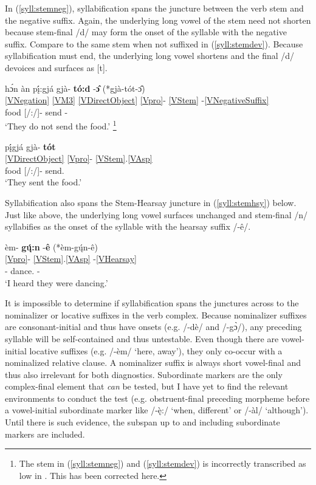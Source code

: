 \documentclass[output=paper]{langscibook}
\begin{document}
\noindent In (\ref{syll:stemneg}), syllabification spans the juncture between the verb stem and the negative suffix. Again, the underlying long vowel of the stem need not shorten because stem-final /d/ may form the onset of the syllable with the negative suffix. Compare to the same stem when not suffixed in (\ref{syll:stemdev}). Because syllabification must end, the underlying long vowel shortens and the final /d/ devoices and surfaces as [t]. 

\ea \label{syll:stemneg}
\glll h\'{ɔ}n \`an p\k{í}:gjá gj\`a- \textbf{tó:d} -\textbf{\^{ɔ}} (*gj\`a-tót-\^{ɔ})\\
\ref{VNegation} \ref{VM3} \ref{VDirectObject} {\ref{Vpro}}- \ref{VStem} -\ref{VNegativeSuffix}\\
{\Neg} {\Hab} food [\Third\Sg/\Aarg:\Sg/\Obj]- send -{\Neg}\\
\trans `They do not send the food.' \citep[][83]{Miller:2018}\footnote{The stem in (\ref{syll:stemneg}) and (\ref{syll:stemdev}) is incorrectly transcribed as low in \citet{Miller:2018}. This has been corrected here.} %
\z 

\ea \label{syll:stemdev}
\glll p\k{í}gjá gj\`a- \textbf{tót}\\
\ref{VDirectObject} {\ref{Vpro}}- \ref{VStem}.\ref{VAsp}\\
food [\Third\Sg/\Aarg:\Sg/\Obj]- send.{\Pfv}\\
\trans `They sent the food.' \citep[][83]{Miller:2018} %
\z 

\noindent Syllabification also spans the Stem-Hearsay juncture in (\ref{syll:stemhsy}) below. Just like above, the underlying long vowel surfaces unchanged and stem-final /n/ syllabifies as the onset of the syllable with the hearsay suffix /-ê/.

\ea \label{syll:stemhsy}
\glll èm- \textbf{g\k{ú}:n} -\textbf{ê} (*èm-g\k{ú}n-ê) \\
{\ref{Vpro}}- \ref{VStem}.\ref{VAsp} -\ref{VHearsay}\\
[\Third\Sg/\Refl]- dance.{\Ipfv} -{\Hsy}\\
\trans`I heard they were dancing.' \citep[][93]{Miller:2018} %
\z 

It is impossible to determine if syllabification spans the junctures across to the nominalizer or locative suffixes in the verb complex. Because nominalizer suffixes are consonant-initial and thus have onsets (e.g. /-dè/ and /-g\`{ɔ}/), any preceding syllable will be self-contained and thus untestable. Even though there are vowel-initial locative suffixes (e.g. /-èm/ `here, away'), they only co-occur with a nominalized relative clause. A nominalizer suffix is always short vowel-final and thus also irrelevant for both diagnostics. Subordinate markers are the only complex-final element that \textit{can} be tested, but I have yet to find the relevant environments to conduct the test (e.g. obstruent-final preceding morpheme before a vowel-initial subordinate marker like /-\k{è}:/ `when, different' or /-\`al/ `although'). Until there is such evidence, the subspan up to and including subordinate markers are included.
\end{document}
